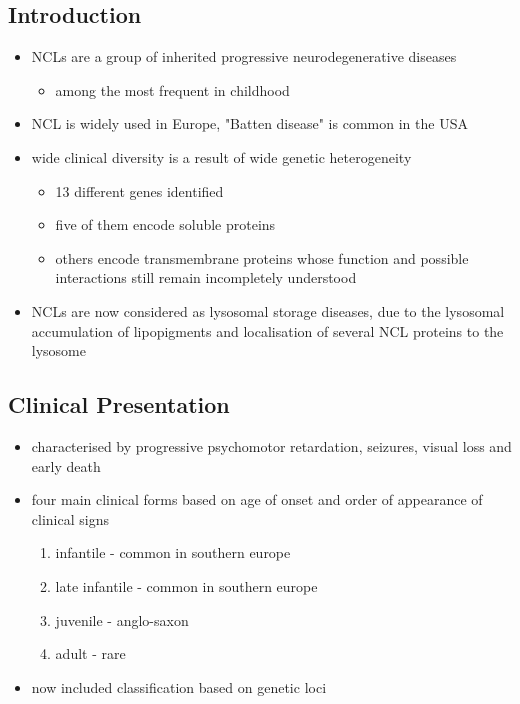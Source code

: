 \documentclass{scrartcl}
\begin{document}
\subsection{Introduction}
\label{sec:org4af002f}
\begin{itemize}
\item NCLs are a group of inherited progressive neurodegenerative diseases
\begin{itemize}
\item among the most frequent in childhood
\end{itemize}
\item NCL is widely used in Europe, "Batten disease" is common in the USA
\item wide clinical diversity is a result of  wide genetic heterogeneity
\begin{itemize}
\item 13 different genes identified
\item five of them encode soluble proteins
\item others encode transmembrane proteins whose function and possible
interactions still remain incompletely understood
\end{itemize}
\item NCLs are now considered as lysosomal storage diseases, due to the
lysosomal accumulation of lipopigments and localisation of several
NCL proteins to the lysosome
\end{itemize}

\subsection{Clinical Presentation}
\label{sec:org9dee2d0}
\begin{itemize}
\item characterised by progressive psychomotor retardation, seizures,
visual loss and early death
\item four main clinical forms based on age of onset and order of
appearance of clinical signs
\begin{enumerate}
\item infantile - common in southern europe
\item late infantile - common in southern europe
\item juvenile - anglo-saxon
\item adult - rare
\end{enumerate}
\item now included classification based on genetic loci
\end{itemize}
\end{document}

